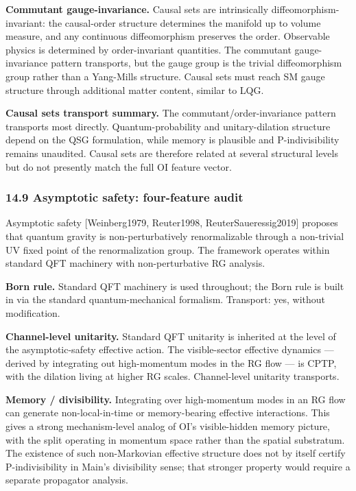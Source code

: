 \documentclass[
]{article}
\begin{document}
\textbf{Commutant gauge-invariance.} Causal sets are intrinsically
diffeomorphism-invariant: the causal-order structure determines the
manifold up to volume measure, and any continuous diffeomorphism
preserves the order. Observable physics is determined by order-invariant
quantities. The commutant gauge-invariance pattern transports, but the
gauge group is the trivial diffeomorphism group rather than a Yang-Mills
structure. Causal sets must reach SM gauge structure through additional
matter content, similar to LQG.

\textbf{Causal sets transport summary.} The commutant/order-invariance
pattern transports most directly. Quantum-probability and
unitary-dilation structure depend on the QSG formulation, while memory
is plausible and P-indivisibility remains unaudited. Causal sets are
therefore related at several structural levels but do not presently
match the full OI feature vector.

\hypertarget{asymptotic-safety-four-feature-audit}{%
\subsubsection{14.9 Asymptotic safety: four-feature
audit}\label{asymptotic-safety-four-feature-audit}}

Asymptotic safety {[}Weinberg1979, Reuter1998, ReuterSaueressig2019{]}
proposes that quantum gravity is non-perturbatively renormalizable
through a non-trivial UV fixed point of the renormalization group. The
framework operates within standard QFT machinery with non-perturbative
RG analysis.

\textbf{Born rule.} Standard QFT machinery is used throughout; the Born
rule is built in via the standard quantum-mechanical formalism.
Transport: yes, without modification.

\textbf{Channel-level unitarity.} Standard QFT unitarity is inherited at
the level of the asymptotic-safety effective action. The visible-sector
effective dynamics --- derived by integrating out high-momentum modes in
the RG flow --- is CPTP, with the dilation living at higher RG scales.
Channel-level unitarity transports.

\textbf{Memory / divisibility.} Integrating over high-momentum modes in
an RG flow can generate non-local-in-time or memory-bearing effective
interactions. This gives a strong mechanism-level analog of OI's
visible-hidden memory picture, with the split operating in momentum
space rather than the spatial substratum. The existence of such
non-Markovian effective structure does not by itself certify
P-indivisibility in Main's divisibility sense; that stronger property
would require a separate propagator analysis.
\end{document}
